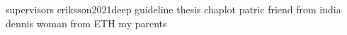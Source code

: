 supervisors
eriksson2021deep
guideline thesis
chaplot
patric
friend from india
dennis
woman from ETH
my parents
